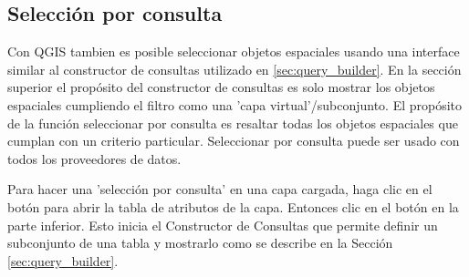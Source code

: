 \subsection{Selecci\'on por consulta}\label{sec:select_by_query}

Con QGIS tambien es posible seleccionar objetos espaciales usando una interface similar al constructor de consultas utilizado en \ref{sec:query_builder}. En la secci\'on superior el prop\'osito del constructor de consultas es solo mostrar los objetos espaciales cumpliendo el filtro como una 'capa virtual'/subconjunto. El prop\'osito de la funci\'on seleccionar por consulta es resaltar todas los objetos espaciales que cumplan con un criterio particular. Seleccionar por consulta puede ser usado con todos los proveedores de datos.

Para hacer una 'selecci\'on por consulta' en una capa cargada, haga clic en el bot\'on  para abrir la tabla de atributos de la capa. Entonces clic en el bot\'on  en la parte inferior. Esto inicia el Constructor de Consultas que permite definir un subconjunto de una tabla y mostrarlo como se describe en la Secci\'on \ref{sec:query_builder}.


